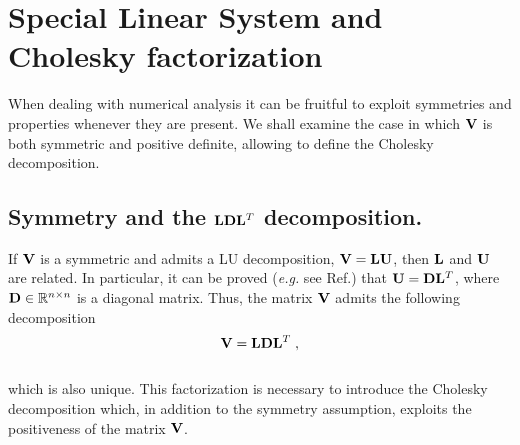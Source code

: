 \documentclass[../main.tex]{subfiles}
\begin{document}
\section{Special Linear System and Cholesky factorization}
When dealing with numerical analysis it can be fruitful to exploit symmetries and properties whenever they are present. We shall examine the case in which $\mathbf{V}$ is both symmetric and positive definite, allowing to define the Cholesky decomposition.

\subsection*{Symmetry and the $\mathbf{L} \mathbf{D} \mathbf{L}^T$ decomposition.}
If $\mathbf{V}$ is a symmetric and admits a LU decomposition, $\mathbf{V} = \mathbf{L} \mathbf{U}$, then $\mathbf{L}$ and $\mathbf{U}$ are related. In particular, it can be proved (\textit{e.g.} see Ref.\cite{GoluVanl96}) that $\mathbf{U} = \mathbf{D} \mathbf{L}^T$, where $\mathbf{D} \in \mathbb{R}^{n \times n}$ is a diagonal matrix. Thus, the matrix $\mathbf{V}$ admits the following decomposition
\\
\begin{equation*}
    \mathbf{V} = \mathbf{L} \mathbf{D} \mathbf{L}^T \;,
\end{equation*}
\\
which is also unique. This factorization is necessary to introduce the Cholesky decomposition which, in addition to the symmetry assumption, exploits the positiveness of the matrix $\mathbf{V}$.
\end{document}
